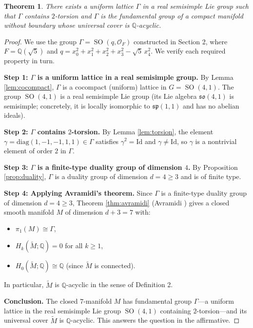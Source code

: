 \documentclass[12pt]{article}
\newtheorem{theorem}{Theorem}
\theoremstyle{definition}
\DeclareMathOperator{\SO}{SO}
\begin{document}
\begin{theorem}\label{thm:main}
  There exists a uniform lattice $\Gamma$ in a real semisimple Lie group such that
  $\Gamma$ contains $2$-torsion and $\Gamma$ is the fundamental group of a compact
  manifold without boundary whose universal cover is $\mathbb{Q}$-acyclic.
\end{theorem}

\begin{proof}
We use the group $\Gamma = \SO(q, \mathcal{O}_F)$ constructed in Section 2, where
$F = \mathbb{Q}(\sqrt{5})$ and $q = x_0^2 + x_1^2 + x_2^2 + x_3^2 - \sqrt{5}\,x_4^2$.
We verify each required property in turn.

\textbf{Step 1: $\Gamma$ is a uniform lattice in a real semisimple group.}
By Lemma \ref{lem:cocompact}, $\Gamma$ is a cocompact (uniform) lattice in
$G = \SO(4,1)$.  The group $\SO(4,1)$ is a real semisimple Lie group (its Lie algebra
$\mathfrak{so}(4,1)$ is semisimple; concretely, it is locally isomorphic to
$\mathfrak{sp}(1,1)$ and has no abelian ideals).

\textbf{Step 2: $\Gamma$ contains $2$-torsion.}
By Lemma \ref{lem:torsion}, the element
$\gamma = \mathrm{diag}(1,-1,-1,1,1) \in \Gamma$
satisfies $\gamma^2 = \mathrm{Id}$ and $\gamma \neq \mathrm{Id}$, so $\gamma$ is a
nontrivial element of order $2$ in $\Gamma$.

\textbf{Step 3: $\Gamma$ is a finite-type duality group of dimension $4$.}
By Proposition \ref{prop:duality}, $\Gamma$ is a duality group of dimension $d = 4 \geq 3$
and is of finite type.

\textbf{Step 4: Applying Avramidi's theorem.}
Since $\Gamma$ is a finite-type duality group of dimension $d = 4 \geq 3$, Theorem
\ref{thm:avramidi} (Avramidi \cite{Avramidi2018}) gives a closed smooth manifold $M$ of
dimension $d + 3 = 7$ with:
\begin{itemize}
  \item $\pi_1(M) \cong \Gamma$,
  \item $H_k(\widetilde{M};\mathbb{Q}) = 0$ for all $k \geq 1$,
  \item $H_0(\widetilde{M};\mathbb{Q}) \cong \mathbb{Q}$ (since $\widetilde{M}$ is
    connected).
\end{itemize}
In particular, $\widetilde{M}$ is $\mathbb{Q}$-acyclic in the sense of Definition 2.

\textbf{Conclusion.}
The closed $7$-manifold $M$ has fundamental group $\Gamma$---a uniform lattice in the
real semisimple Lie group $\SO(4,1)$ containing $2$-torsion---and its universal cover
$\widetilde{M}$ is $\mathbb{Q}$-acyclic.  This answers the question in the affirmative.
\end{proof}
\end{document}

